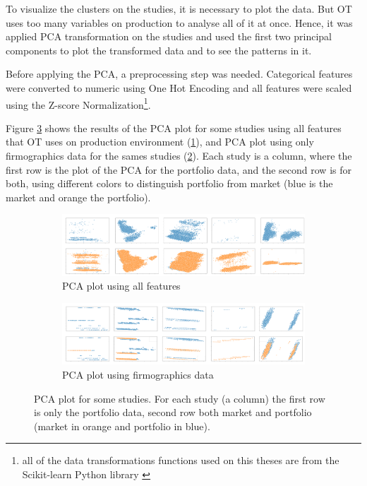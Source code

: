 To visualize the clusters on the studies, it is necessary to plot the data. But OT uses too many variables on production to analyse all of it at once. Hence, it was applied PCA transformation on the studies and used the first two principal components to plot the transformed data and to see the patterns in it. 

Before applying the PCA, a preprocessing step was needed. Categorical features were converted to numeric using One Hot Encoding and all features were scaled using the Z-score Normalization\footnote{all of the data transformations functions used on this theses are from the Scikit-learn Python library \cite{scikit-learn}}.

Figure \ref{fig:pca-plot} shows the results of the PCA plot for some studies using all features that OT uses on production environment (\ref{fig:pca-plot:all-features}), and PCA plot using only firmographics data for the sames studies (\ref{fig:pca-plot:firmographics}). Each study is a column, where the first row is the plot of the PCA for the portfolio data, and the second row is for both, using different colors to distinguish portfolio from market (blue is the market and orange the portfolio).

\begin{figure}[!ht]
    \begin{subfigure}{\linewidth}
        \centering
        \includegraphics[width=\linewidth]{fig/ch3-pca-plot-all-features.png}
        \caption{PCA plot using all features}
        \label{fig:pca-plot:all-features}
    \end{subfigure}
    \begin{subfigure}{\linewidth}
        \centering
        \includegraphics[width=\linewidth]{fig/ch3-pca-plot-firmographics.png}
        \caption{PCA plot using firmographics data}
        \label{fig:pca-plot:firmographics}
    \end{subfigure}
    \caption{PCA plot for some studies. For each study (a column) the first row is only the portfolio data, second row both market and portfolio (market in orange and portfolio in blue).}
    \label{fig:pca-plot}
\end{figure}

